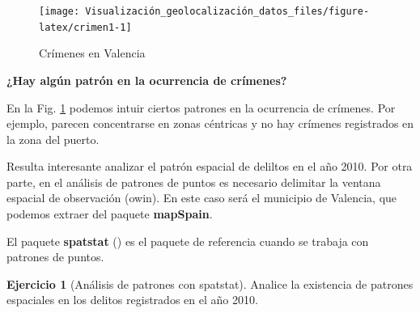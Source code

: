 \documentclass[
]{book}
\theoremstyle{definition}
\theoremstyle{definition}
\theoremstyle{definition}
\newtheorem{exercise}{Ejercicio}[chapter]
\theoremstyle{definition}
\theoremstyle{remark}
\begin{document}
\begin{figure}

{\centering \texttt{[image: Visualización\_geolocalización\_datos\_files/figure-latex/crimen1-1]} 

}

\caption{Crímenes en Valencia}\label{fig:crimen1}
\end{figure}

\textbf{¿Hay algún patrón en la ocurrencia de crímenes?}

En la Fig. \ref{fig:crimen1} podemos intuir ciertos patrones en la ocurrencia
de crímenes. Por ejemplo, parecen concentrarse en zonas céntricas y no hay
crímenes registrados en la zona del puerto.

Resulta interesante analizar el patrón espacial de deliltos en el año
2010. Por otra parte, en el análisis de patrones de puntos es necesario delimitar la
ventana espacial de observación (owin). En este caso será el municipio de
Valencia, que podemos extraer del paquete \textbf{mapSpain}.

El paquete \textbf{spatstat} (\citet{spatstat_2005}) es el paquete de referencia cuando se
trabaja con patrones de puntos.

\begin{exercise}[Análisis de patrones con spatstat]
\protect\hypertarget{exr:ex30}{}\label{exr:ex30}Analice la existencia de patrones espaciales en los delitos registrados en el año 2010.
\end{exercise}
\end{document}
